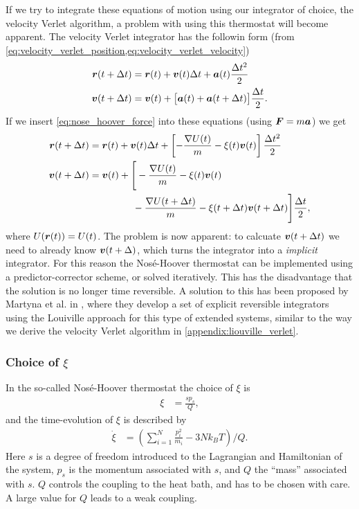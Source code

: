 If we try to integrate these equations of motion using our integrator of choice, the velocity Verlet algorithm, a problem with using this thermostat will become apparent. The velocity Verlet integrator has the followin form (from \cref{eq:velocity_verlet_position,eq:velocity_verlet_velocity})
\begin{align*}
    \boldsymbol{r}(t + \Delta t) &= \boldsymbol{r}(t) + \boldsymbol{v}(t)\Delta t + \boldsymbol{a}(t)\frac{\Delta t^2}{2}\\
    \boldsymbol{v}(t + \Delta t) &= \boldsymbol{v}(t) + \big[\boldsymbol{a}(t) + \boldsymbol{a}(t + \Delta t)\big] \frac{\Delta t}{2}.
\end{align*}
If we insert \cref{eq:nose_hoover_force} into these equations (using $\boldsymbol{F} = m\boldsymbol{a}$) we get
\begin{align*}
    \rvec(t + \Delta t) &= \rvec(t) + \vvec(t)\Delta t + \left[ -\frac{\nabla U(t)}{m} - \xi(t)\vec v(t) \right] \frac{\Delta t^2}{2}\\
    \vvec(t + \Delta t) 
        &= \vvec(t) + \Bigg[ 
                -\frac{\nabla U(t)}{m} - \xi(t)\vec v(t) \\
                &\phantom{= \vvec(t) + \Big[} -\frac{\nabla U(t+\Delta t)}{m} - \xi(t+\Delta t)\vec v(t+\Delta t)
        \Bigg] 
        \frac{\Delta t}{2},
\end{align*}
where $U(\boldsymbol{r}(t)) = U(t)$. The problem is now apparent: to calcuate $\boldsymbol{v}(t+\Delta t)$ we need to already know $\boldsymbol{v}(t+\Delta)$, which turns the integrator into a \emph{implicit} integrator. For this reason the Nosé-Hoover thermostat can be implemented using a predictor-corrector scheme, or solved iteratively\cite[Appendix E.2]{frenkel2001understanding}. This has the disadvantage that the solution is no longer time reversible. A solution to this has been proposed by Martyna et al. in \cite{martyna1996explicit}, where they develop a set of explicit reversible integrators using the Louiville approach for this type of extended systems, similar to the way we derive the velocity Verlet algorithm in \cref{appendix:liouville_verlet}.

\subsubsection{Choice of $\xi$}
In the so-called Nosé-Hoover thermostat the choice of $\xi$ is
\begin{align}
    \xi             &= \frac{sp_s}{Q},\label{eq:nose_hoover_xi}
\end{align}
and the time-evolution of $\xi$ is described by
\begin{align}
    \dot\xi         &= \left( \sum_{i=1}^N \frac{p_i^2}{m_i} - 3Nk_BT \right) / Q.\label{eq:nose_hoover_dot_xi}
\end{align}
Here $s$ is a degree of freedom introduced to the Lagrangian and Hamiltonian of the system, $p_s$ is the momentum associated with $s$, and $Q$ the ``mass'' associated with $s$. $Q$ controls the coupling to the heat bath, and has to be chosen with care. A large value for $Q$ leads to a weak coupling.

